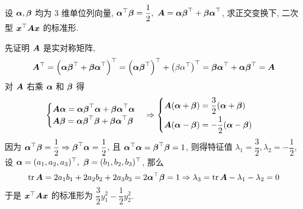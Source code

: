 
\begin{example}
    设 $\vb*{\alpha},\vb*{\beta}$ 均为 3 维单位列向量, $\vb*{\alpha}^\top\vb*{\beta}=\dfrac{1}{2},~\vb*{A}=\vb*{\alpha\beta}^\top+\vb*{\beta\alpha}^\top$, 求正交变换下, 二次型 $\vb*{x}^\top\vb*{Ax}$ 的标准形.
\end{example}
\begin{solution}
    先证明 $\vb*{A}$ 是实对称矩阵,
    $$\vb*{A}^\top=\qty(\vb*{\alpha\beta}^\top+\vb*{\beta\alpha}^\top)^\top=\qty(\vb*{\alpha\beta}^\top)^\top+\qty(\beta\alpha^\top)^\top=\vb*{\beta\alpha}^\top+\vb*{\alpha\beta}^\top=\vb*{A}$$
    对 $\vb*{A}$ 右乘 $\vb*{\alpha}$ 和 $\vb*{\beta}$ 得
    $$\begin{cases}
            \vb*{A\alpha}=\vb*{\alpha\beta}^\top\vb*{\alpha}+\vb*{\beta\alpha}^\top\vb*{\alpha} \\
            \vb*{A\beta}=\vb*{\alpha\beta}^\top\vb*{\beta}+\vb*{\beta\alpha}^\top\vb*{\beta}
        \end{cases}\Rightarrow\begin{cases}
            \vb*{A}(\vb*{\alpha}+\vb*{\beta})=\dfrac{3}{2}(\vb*{\alpha}+\vb*{\beta}) \\[6pt]
            \vb*{A}(\vb*{\alpha}-\vb*{\beta})=-\dfrac{1}{2}(\vb*{\alpha}-\vb*{\beta})
        \end{cases}$$
    因为 $\vb*{\alpha}^\top\vb*{\beta}=\dfrac{1}{2}\Rightarrow\vb*{\beta}^\top\vb*{\alpha}=\dfrac{1}{2}$, 且 $\vb*{\alpha}^\top\vb*{\alpha}=\vb*{\beta}^\top\vb*{\beta}=1$, 则得特征值
    $\lambda_1=\dfrac{3}{2},\lambda_2=-\dfrac{1}{2}$, 设 $\vb*{\alpha}=(a_1,a_2,a_3)^\top,~\vb*{\beta}=(b_1,b_2,b_3)^\top$,
    那么 $$\tr\vb*{A}=2a_1b_1+2a_2b_2+2a_3b_3=2\vb*{\alpha}^\top\vb*{\beta}=1\Rightarrow \lambda_3=\tr\vb*{A}-\lambda_1-\lambda_2=0$$
    于是 $\vb*{x}^\top\vb*{Ax}$ 的标准形为 $\dfrac{3}{2}y_1^2-\dfrac{1}{2}y_2^2.$
\end{solution}

